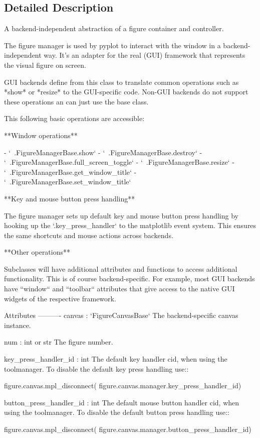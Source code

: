 \subsection{Detailed Description}
\begin{DoxyVerb}A backend-independent abstraction of a figure container and controller.

The figure manager is used by pyplot to interact with the window in a
backend-independent way. It's an adapter for the real (GUI) framework that
represents the visual figure on screen.

GUI backends define from this class to translate common operations such
as *show* or *resize* to the GUI-specific code. Non-GUI backends do not
support these operations an can just use the base class.

This following basic operations are accessible:

**Window operations**

- `~.FigureManagerBase.show`
- `~.FigureManagerBase.destroy`
- `~.FigureManagerBase.full_screen_toggle`
- `~.FigureManagerBase.resize`
- `~.FigureManagerBase.get_window_title`
- `~.FigureManagerBase.set_window_title`

**Key and mouse button press handling**

The figure manager sets up default key and mouse button press handling by
hooking up the `.key_press_handler` to the matplotlib event system. This
ensures the same shortcuts and mouse actions across backends.

**Other operations**

Subclasses will have additional attributes and functions to access
additional functionality. This is of course backend-specific. For example,
most GUI backends have ``window`` and ``toolbar`` attributes that give
access to the native GUI widgets of the respective framework.

Attributes
----------
canvas : `FigureCanvasBase`
    The backend-specific canvas instance.

num : int or str
    The figure number.

key_press_handler_id : int
    The default key handler cid, when using the toolmanager.
    To disable the default key press handling use::

        figure.canvas.mpl_disconnect(
            figure.canvas.manager.key_press_handler_id)

button_press_handler_id : int
    The default mouse button handler cid, when using the toolmanager.
    To disable the default button press handling use::

        figure.canvas.mpl_disconnect(
            figure.canvas.manager.button_press_handler_id)
\end{DoxyVerb}
 

